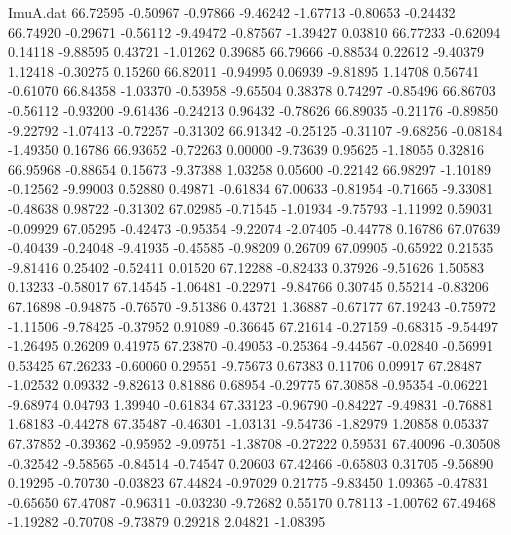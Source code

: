 \begin{filecontents}{ImuA.dat}
  66.72595   -0.50967   -0.97866   -9.46242   -1.67713   -0.80653   -0.24432
  66.74920   -0.29671   -0.56112   -9.49472   -0.87567   -1.39427    0.03810
  66.77233   -0.62094    0.14118   -9.88595    0.43721   -1.01262    0.39685
  66.79666   -0.88534    0.22612   -9.40379    1.12418   -0.30275    0.15260
  66.82011   -0.94995    0.06939   -9.81895    1.14708    0.56741   -0.61070
  66.84358   -1.03370   -0.53958   -9.65504    0.38378    0.74297   -0.85496
  66.86703   -0.56112   -0.93200   -9.61436   -0.24213    0.96432   -0.78626
  66.89035   -0.21176   -0.89850   -9.22792   -1.07413   -0.72257   -0.31302
  66.91342   -0.25125   -0.31107   -9.68256   -0.08184   -1.49350    0.16786
  66.93652   -0.72263    0.00000   -9.73639    0.95625   -1.18055    0.32816
  66.95968   -0.88654    0.15673   -9.37388    1.03258    0.05600   -0.22142
  66.98297   -1.10189   -0.12562   -9.99003    0.52880    0.49871   -0.61834
  67.00633   -0.81954   -0.71665   -9.33081   -0.48638    0.98722   -0.31302
  67.02985   -0.71545   -1.01934   -9.75793   -1.11992    0.59031   -0.09929
  67.05295   -0.42473   -0.95354   -9.22074   -2.07405   -0.44778    0.16786
  67.07639   -0.40439   -0.24048   -9.41935   -0.45585   -0.98209    0.26709
  67.09905   -0.65922    0.21535   -9.81416    0.25402   -0.52411    0.01520
  67.12288   -0.82433    0.37926   -9.51626    1.50583    0.13233   -0.58017
  67.14545   -1.06481   -0.22971   -9.84766    0.30745    0.55214   -0.83206
  67.16898   -0.94875   -0.76570   -9.51386    0.43721    1.36887   -0.67177
  67.19243   -0.75972   -1.11506   -9.78425   -0.37952    0.91089   -0.36645
  67.21614   -0.27159   -0.68315   -9.54497   -1.26495    0.26209    0.41975
  67.23870   -0.49053   -0.25364   -9.44567   -0.02840   -0.56991    0.53425
  67.26233   -0.60060    0.29551   -9.75673    0.67383    0.11706    0.09917
  67.28487   -1.02532    0.09332   -9.82613    0.81886    0.68954   -0.29775
  67.30858   -0.95354   -0.06221   -9.68974    0.04793    1.39940   -0.61834
  67.33123   -0.96790   -0.84227   -9.49831   -0.76881    1.68183   -0.44278
  67.35487   -0.46301   -1.03131   -9.54736   -1.82979    1.20858    0.05337
  67.37852   -0.39362   -0.95952   -9.09751   -1.38708   -0.27222    0.59531
  67.40096   -0.30508   -0.32542   -9.58565   -0.84514   -0.74547    0.20603
  67.42466   -0.65803    0.31705   -9.56890    0.19295   -0.70730   -0.03823
  67.44824   -0.97029    0.21775   -9.83450    1.09365   -0.47831   -0.65650
  67.47087   -0.96311   -0.03230   -9.72682    0.55170    0.78113   -1.00762
  67.49468   -1.19282   -0.70708   -9.73879    0.29218    2.04821   -1.08395

\end{filecontents}
